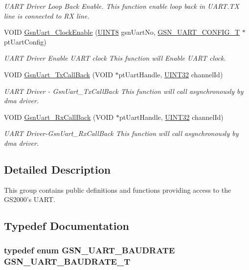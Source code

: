 \begin{DoxyCompactItemize}
\begin{DoxyCompactList}\small\item\em UART Driver Loop Back Enable. This function enable loop back in UART.TX line is connected to RX line. \end{DoxyCompactList}\item 
VOID \hyperlink{a00656_gaca9431f3944d584accd4697be926dde9}{GsnUart\_\-ClockEnable} (\hyperlink{a00660_gab27e9918b538ce9d8ca692479b375b6a}{UINT8} gsnUartNo, \hyperlink{a00268}{GSN\_\-UART\_\-CONFIG\_\-T} $\ast$ptUartConfig)
\begin{DoxyCompactList}\small\item\em UART Driver Enable UART clock This function will Enable UART clock. \end{DoxyCompactList}\item 
VOID \hyperlink{a00656_ga636fb7edc1ca9341330e1ff442e4c917}{GsnUart\_\-TxCallBack} (VOID $\ast$ptUartHandle, \hyperlink{a00660_gae1e6edbbc26d6fbc71a90190d0266018}{UINT32} channelId)
\begin{DoxyCompactList}\small\item\em UART Driver -\/ GsnUart\_\-TxCallBack This function will call asynchronously by dma driver. \end{DoxyCompactList}\item 
VOID \hyperlink{a00656_ga15a22d726c4fae9872826a00f83928eb}{GsnUart\_\-RxCallBack} (VOID $\ast$ptUartHandle, \hyperlink{a00660_gae1e6edbbc26d6fbc71a90190d0266018}{UINT32} channelId)
\begin{DoxyCompactList}\small\item\em UART Driver-\/GsnUart\_\-RxCallBack This function will call asynchronously by dma driver. \end{DoxyCompactList}\end{DoxyCompactItemize}


\subsection{Detailed Description}
This group contains public definitions and functions providing access to the GS2000's UART. 

\subsection{Typedef Documentation}
\hypertarget{a00656_ga867d009d402b5b0186abe5307715b9fc}{
\subsubsection[{GSN\_\-UART\_\-BAUDRATE\_\-T}]{\setlength{\rightskip}{0pt plus 5cm}typedef enum {\bf GSN\_\-UART\_\-BAUDRATE}  {\bf GSN\_\-UART\_\-BAUDRATE\_\-T}}}
\label{a00656_ga867d009d402b5b0186abe5307715b9fc}


